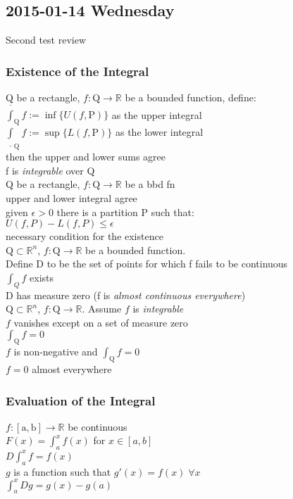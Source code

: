 
\subsection{2015-01-14 Wednesday}
Second test review
\subsubsection{Existence of the Integral}
\LET Q be a rectangle, $f:\mathrm{Q}\to\mathbb{R}$ be a bounded function, define:\\
$\overline{\int}_{\mathrm{Q}} f := \inf\{U(f, \mathrm{P})\}$ as the upper integral\\
$\underline{\int}_{\mathrm{Q}} f := \sup\{L(f, \mathrm{P})\}$ as the lower integral\\
\IF then the upper and lower sums agree\\
\THEN f is \textit{integrable} over Q\\

\LET Q be a rectangle, $f:\mathrm{Q}\to\mathbb{R}$ be a bbd fn\\
\THEN upper and lower integral agree\\
\IFF given $\epsilon>0$ there is a partition P such that:\\
$U(f,P) - L(f,P)\leq\epsilon$\\
\IDEA necessary condition for the existence\\

\LET $\mathrm{Q}\subset\mathbb{R}^n$, $f:\mathrm{Q}\to\mathbb{R}$ be a bounded function.\\
Define D to be the set of points for which f fails to be continuous\\
\THEN $\int_{Q} f$ exists\\
\IFF D has measure zero (f is \textit{almost continuous everywhere})\\

\LET $\mathrm{Q}\subset\mathbb{R}^n$, 
$f:\mathrm{Q}\to\mathbb{R}$.
Assume $f$ is \textit{integrable}\\
\IF $f$ vanishes except on a set of measure zero\\
\THEN $\int_{\mathrm{Q}}f = 0$\\
\IF $f$ is non-negative and $\int_{\mathrm{Q}}f = 0$\\
\THEN $f=0$ almost everywhere

\subsubsection{Evaluation of the Integral}
\LET $f:\mathrm{[a,b]}\to\mathbb{R}$ be continuous\\
\IF $F(x)=\int_a^xf(x)$ for $x\in[a,b]$\\
\THEN $D\int_a^xf=f(x)$\\
\IF $g$ is a function such that $g'(x)=f(x)\;\forall x$\\
\THEN $\int_a^x Dg = g(x)-g(a)$\\

